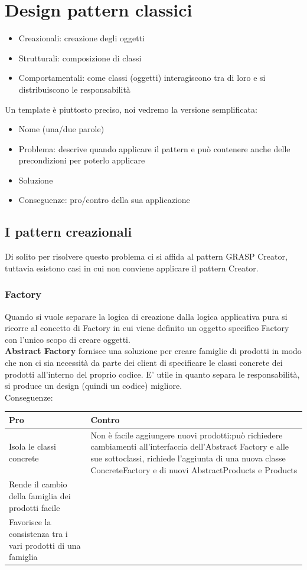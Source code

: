 \documentclass[12pt, a4paper]{report}
\begin{document}
\section{Design pattern classici}
\begin{itemize}
    \item Creazionali: creazione degli oggetti
    \item Strutturali: composizione di classi
    \item Comportamentali: come classi (oggetti) interagiscono tra di loro e si distribuiscono le responsabilità
\end{itemize}
Un template è piuttosto preciso, noi vedremo la versione semplificata:
\begin{itemize}
    \item Nome (una/due parole)
    \item Problema: descrive quando applicare il pattern e può contenere anche delle precondizioni per poterlo applicare
    \item Soluzione
    \item Conseguenze: pro/contro della sua applicazione
\end{itemize}
\subsection{I pattern creazionali}
Di solito per risolvere questo problema ci si affida al pattern GRASP Creator, tuttavia esistono casi in cui non conviene applicare il pattern Creator.
\subsubsection{Factory}
Quando si vuole separare la logica di creazione dalla logica applicativa pura si ricorre al concetto di Factory in cui viene definito un oggetto specifico Factory con l'unico scopo di creare oggetti.\\
\textbf{Abstract Factory} fornisce una soluzione per creare famiglie di prodotti in modo che non ci sia necessità da parte dei client di specificare le classi concrete dei prodotti all'interno del proprio codice. E' utile in quanto separa le responsabilità, si produce un design (quindi un codice) migliore.\\
Conseguenze:
\begin{center}
    \begin{tabular}{| p{5cm} | p{12cm} |}
        \hline
        \textbf{Pro} & \textbf{Contro} \\
        \hline
        Isola le classi concrete & Non è facile aggiungere nuovi prodotti:può richiedere cambiamenti all'interfaccia dell'Abstract Factory e alle sue sottoclassi, richiede l'aggiunta di una nuova classe ConcreteFactory e di nuovi AbstractProducts e Products \\    
        \hline
        Rende il cambio della famiglia dei prodotti facile & \\
        \hline
        Favorisce  la consistenza tra i vari prodotti di una famiglia & \\
        \hline
    \end{tabular}
\end{center}
\end{document}
